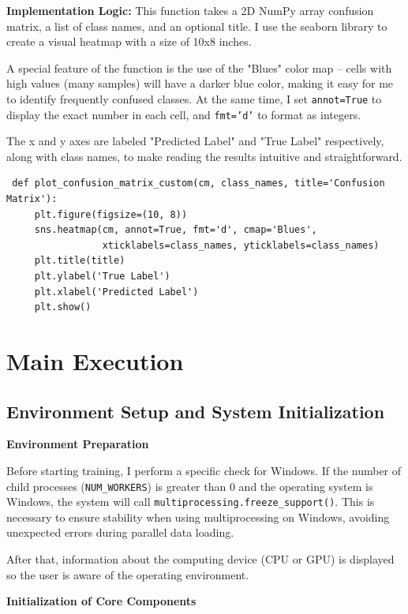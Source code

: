 \documentclass[12pt, a4paper, openany]{report}
\begin{document}
 \textbf{Implementation Logic:} %
 This function takes a 2D NumPy array confusion matrix, a list of class names, and an optional title. I use the seaborn library to create a visual heatmap with a size of 10x8 inches.

 A special feature of the function is the use of the "Blues" color map – cells with high values (many samples) will have a darker blue color, making it easy for me to identify frequently confused classes. At the same time, I set \texttt{annot=True} to display the exact number in each cell, and \texttt{fmt='d'} to format as integers.

 The x and y axes are labeled "Predicted Label" and "True Label" respectively, along with class names, to make reading the results intuitive and straightforward.

 \begin{verbatim}
 def plot_confusion_matrix_custom(cm, class_names, title='Confusion Matrix'):
     plt.figure(figsize=(10, 8))
     sns.heatmap(cm, annot=True, fmt='d', cmap='Blues',
                 xticklabels=class_names, yticklabels=class_names)
     plt.title(title)
     plt.ylabel('True Label')
     plt.xlabel('Predicted Label')
     plt.show()
 \end{verbatim}

 \section{Main Execution} %
 \subsection{Environment Setup and System Initialization} %
 \textbf{Environment Preparation} %

 Before starting training, I perform a specific check for Windows. If the number of child processes (\texttt{NUM\_WORKERS}) is greater than 0 and the operating system is Windows, the system will call \texttt{multiprocessing.freeze\_support()}. This is necessary to ensure stability when using multiprocessing on Windows, avoiding unexpected errors during parallel data loading.

 After that, information about the computing device (CPU or GPU) is displayed so the user is aware of the operating environment.

 \textbf{Initialization of Core Components} %
\end{document}
